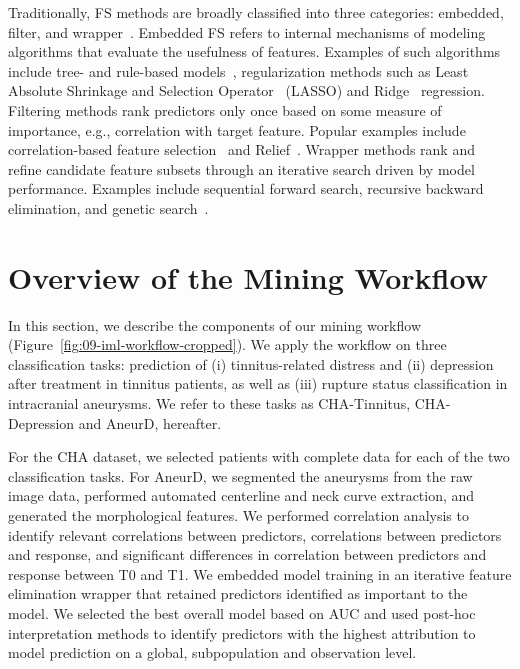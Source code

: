 \documentclass[
  oneside]{book}
\begin{document}
Traditionally, FS methods are broadly classified into three categories: embedded, filter, and wrapper~\autocite{Guyon:RFE2003}.
Embedded FS refers to internal mechanisms of modeling algorithms that evaluate the usefulness of features.
Examples of such algorithms include tree- and rule-based models~\autocite{Quinlan:C451993,kuhn2013applied}, regularization methods such as Least Absolute Shrinkage and Selection Operator~\autocite{lasso} (LASSO) and Ridge~\autocite{ridge} regression.
Filtering methods rank predictors only once based on some measure of importance, e.g., correlation with target feature.
Popular examples include correlation-based feature selection~\autocite{Hall:CFS2000} and Relief~\autocite{kira1992feature}.
Wrapper methods rank and refine candidate feature subsets through an iterative search driven by model performance.
Examples include sequential forward search, recursive backward elimination, and genetic search~\autocite{chandrashekar2014survey}.

\hypertarget{iml-workflow}{%
\section{Overview of the Mining Workflow}\label{iml-workflow}}

In this section, we describe the components of our mining workflow (Figure~\ref{fig:09-iml-workflow-cropped}).
We apply the workflow on three classification tasks: prediction of (i) tinnitus-related distress and (ii) depression after treatment in tinnitus patients, as well as (iii) rupture status classification in intracranial aneurysms.
We refer to these tasks as CHA-Tinnitus, CHA-Depression and AneurD, hereafter.



For the CHA dataset, we selected patients with complete data for each of the two classification tasks. For AneurD, we segmented the aneurysms from the raw image data, performed automated centerline and neck curve extraction, and generated the morphological features. We performed correlation analysis to identify relevant correlations between predictors, correlations between predictors and response, and significant differences in correlation between predictors and response between T0 and T1. We embedded model training in an iterative feature elimination wrapper that retained predictors identified as important to the model. We selected the best overall model based on AUC and used post-hoc interpretation methods to identify predictors with the highest attribution to model prediction on a global, subpopulation and observation level.
\end{document}
